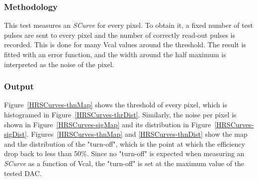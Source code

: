 \documentclass[a4paper,12pt,twoside]{article}
\begin{document}
\subsubsection{Methodology}
This test measures an \textit{SCurve} for every pixel. To obtain it, a fixed number of test pulses are sent to every pixel and the number of correctly read-out pulses is recorded. This is done for many Vcal values around the threshold. The result is fitted with an error function, and the width around the half maximum is interpreted as the noise of the pixel.
\subsubsection{Output}
Figure~\ref{HRSCurves-thnMap} shows the threshold of every pixel, which is histogramed in Figure~\ref{HRSCurves-thrDist}. Similarly, the noise per pixel is shown in Figure~\ref{HRSCurves-sigMap} and its distribution in Figure~\ref{HRSCurves-sigDist}. Figures~\ref{HRSCurves-thnMap} and \ref{HRSCurves-thnDist} show the map and the distribution of the "turn-off", which is the point at which the efficiency drop back to less than 50\%. Since no "turn-off" is expected when measuring an \textit{SCurve} as a function of Vcal, the "turn-off" is set at the maximum value of the tested DAC. 
\end{document}
